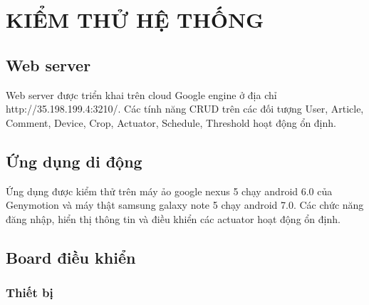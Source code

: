 \documentclass[a4paper,12pt,oneside]{article}
\begin{document}
\newpage
\section{KIỂM THỬ HỆ THỐNG}
\subsection{Web server}
\noindent Web server được triển khai trên cloud Google engine ở địa chỉ http://35.198.199.4:3210/. Các tính năng CRUD trên các đối tượng User, Article, Comment, Device, Crop, Actuator, Schedule, Threshold hoạt động ổn định. 
\subsection{Ứng dụng di động}
\noindent Ứng dụng được kiểm thử trên máy ảo google nexus 5 chạy android 6.0 của Genymotion và máy thật samsung galaxy note 5 chạy android 7.0. Các chức năng đăng nhập, hiển thị thông tin và điều khiển các actuator hoạt động ổn định.
\subsection{Board điều khiển}
\subsubsection{Thiết bị}
\end{document}
